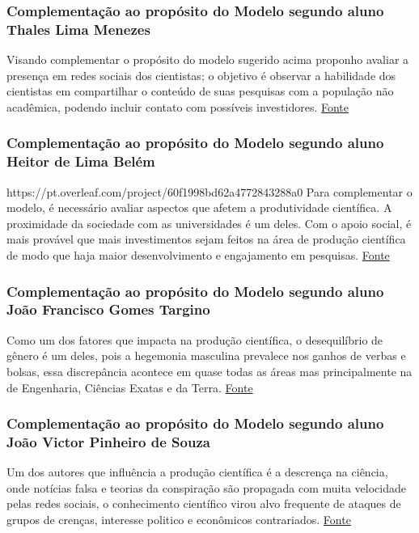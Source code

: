 \subsubsection{Complementação ao propósito do Modelo segundo aluno Thales Lima Menezes}

Visando complementar o propósito do modelo sugerido acima proponho avaliar a presença em redes sociais dos cientistas; o objetivo é observar a habilidade dos cientistas em compartilhar o conteúdo de suas pesquisas com a população não acadêmica, podendo incluir contato com possíveis investidores. \href{https://vejasp.abril.com.br/cultura-lazer/influencers-ciencia-atila-iamarino/}{Fonte}

\subsubsection{Complementação ao propósito do Modelo segundo aluno Heitor de Lima Belém}https://pt.overleaf.com/project/60f1998bd62a4772843288a0
Para complementar o modelo, é necessário avaliar aspectos que afetem a produtividade científica. A proximidade da sociedade com as universidades é um deles. Com o apoio social, é mais provável que mais investimentos sejam feitos na área de produção científica de modo que haja maior desenvolvimento e engajamento em pesquisas. \href{https://www.periodicosdeminas.ufmg.br/entenda-os-atuais-desafios-das-pesquisas-cientificas/}{Fonte}

\subsubsection{Complementação ao propósito do Modelo segundo aluno João Francisco Gomes Targino}
Como um dos fatores que impacta na produção científica, o desequilíbrio de gênero é um deles, pois a hegemonia masculina prevalece nos ganhos de verbas e bolsas, essa discrepância acontece em quase todas as áreas mas principalmente na de Engenharia, Ciências Exatas e da Terra.
\href{https://sites.usp.br/psicousp/desequilibrio-de-genero-afeta-mulheres-cientistas-brasil/}{Fonte}

\subsubsection{Complementação ao propósito do Modelo segundo aluno João Victor Pinheiro de Souza}

Um dos autores que influência a produção científica é a descrença na ciência, onde notícias falsa e teorias da conspiração são propagada com muita velocidade pelas redes sociais, o conhecimento científico virou alvo frequente de ataques de grupos de crenças, interesse politico e econômicos contrariados.
\href{https://revistapesquisa.fapesp.br/resistencia-a-ciencia/}{Fonte}

